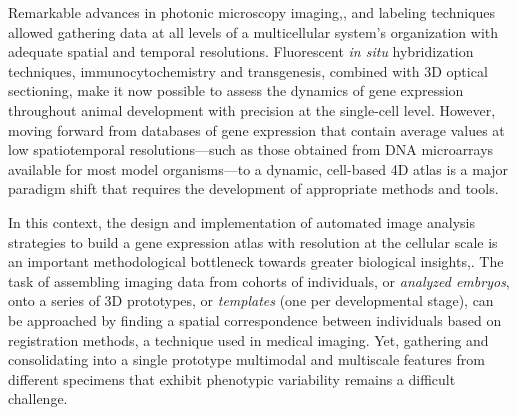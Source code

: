 Remarkable advances in photonic microscopy imaging\cite{megason2007imaging},\cite{abbott2009microscopic},\cite{supatto2011advances} and labeling techniques\cite{chudakov2010fluorescent} allowed gathering data at all levels of a multicellular system's organization with adequate spatial and temporal resolutions. Fluorescent \emph{in situ} hybridization techniques\cite{choi2010}, immunocytochemistry and transgenesis, combined with 3D optical sectioning, make it now possible to assess the dynamics of gene expression throughout animal development with precision at the single-cell level. However, moving forward from databases of gene expression that contain average values at low spatiotemporal resolutions---such as those obtained from DNA microarrays available for most model organisms---to a dynamic, cell-based 4D atlas is a major paradigm shift that requires the development of appropriate methods and tools.



In this context, the design and implementation of automated image analysis strategies to build a gene expression atlas with resolution at the cellular scale is an important methodological bottleneck towards greater biological insights\cite{luengo2011image},\cite{castro2012assembling}. The task of assembling imaging data from cohorts of individuals, or \emph{analyzed embryos}, onto a series of 3D prototypes, or \emph{templates} (one per developmental stage), can be approached by finding a spatial correspondence between individuals based on registration methods, a technique used in medical imaging\cite{zitova2003image}. Yet, gathering and consolidating into a single prototype multimodal and multiscale features from different specimens that exhibit phenotypic variability remains a difficult challenge.



